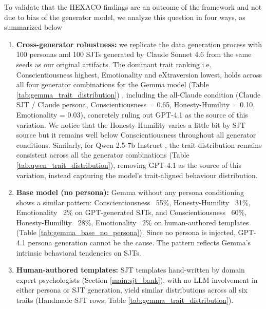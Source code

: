 \documentclass[11pt]{article}
\newcommand{\honestyhumility}{%
  {\textcolor{hexH}{Honesty-Humility}}%
}
\newcommand{\emotionality}{%
  {\textcolor{hexE}{Emotionality}}%
}
\newcommand{\extraversion}{%
  {\textcolor{hexX}{eXtraversion}}%
}
\newcommand{\conscientiousness}{%
  {\textcolor{hexC}{Conscientiousness}}%
}
\newcommand{\sj}[1]{\textcolor{blue}{\newline (SJ: #1) \newline}}
\begin{document}
To validate that the HEXACO findings are an outcome of the framework and not due to bias of the generator model, we analyze this question in four ways, as summarized below

\begin{enumerate}
    \item \textbf{Cross-generator robustness:} we replicate the data generation process with 100 personas and 100 SJTs generated by Claude Sonnet 4.6 \citep{anthropic2026claudesonnet} from the same seeds as our original artifacts. The dominant trait ranking i.e. \conscientiousness\; highest, \emotionality\; and \extraversion\; lowest, holds across all four generator combinations for the Gemma model (Table \ref{tab:gemma_trait_distribution}) , including the all-Claude condition (Claude SJT / Claude persona, \conscientiousness\;= 0.65, \honestyhumility\;= 0.10, \emotionality\;= 0.03), concretely ruling out GPT-4.1 as the source of this variation. We notice that the \honestyhumility\; varies a little bit by SJT source but it remains well below \conscientiousness\; throughout all generator conditions. Similarly, for Qwen 2.5-7b Instruct \citep{qwen2025qwen25technicalreport}, the trait distribution remains consistent across all the generator combinations (Table \ref{tab:qwen_trait_distribution}), removing GPT-4.1 as the source of this variation, instead capturing the model's trait-aligned behaviour distribution.
    
    \item \textbf{Base model (no persona):} Gemma without any persona conditioning shows a similar pattern: \conscientiousness\; ~55\%, \honestyhumility\; ~31\%, \emotionality\; ~2\% on GPT-generated SJTs, and \conscientiousness\; ~60\%, \honestyhumility\; ~28\%, \emotionality\; ~2\% on human-authored templates (Table \ref{tab:gemma_base_no_persona}). Since no persona is injected, GPT-4.1 persona generation cannot be the cause. The pattern reflects Gemma's intrinsic behavioral tendencies on SJTs. 

    \item \textbf{Human-authored templates:} SJT templates hand-written by domain expert psychologists (Section \ref{main:sjt_bank}), with no LLM involvement in either persona or SJT generation, yield similar distributions across all six traits (Handmade SJT rows, Table \ref{tab:gemma_trait_distribution}).


    
\end{enumerate}
\end{document}
